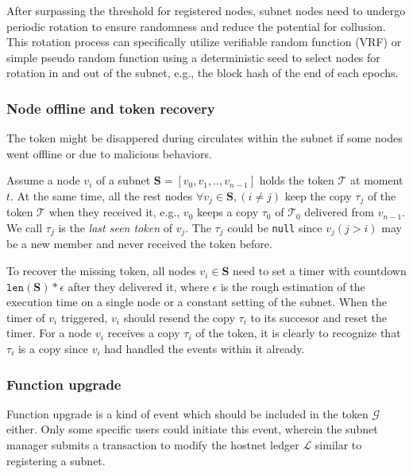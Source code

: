 \documentclass[11pt]{article}
\begin{document}
After surpassing the threshold for registered nodes, subnet nodes need to undergo periodic rotation to ensure randomness and reduce the potential for collusion.
This rotation process can specifically utilize verifiable random function (VRF) or simple pseudo random function using a deterministic seed to select nodes for rotation in and out of the subnet, e.g., the block hash of the end of each epochs.


\subsubsection{Node offline and token recovery}
The token might be disappered during circulates within the subnet if some nodes went offline or due to malicious behaviors.

Assume a node $v_{i}$ of a subnet $\mathbf{S} = [v_{0}, v_{1}, .., v_{n-1}]$ holds the token $\mathcal{T}$ at moment $t$.
At the same time, all the rest nodes $\forall v_{j} \in \mathbf{S}, (i \ne j)$ keep the copy $\tau_{j}$ of the token $\mathcal{T}$ when they received it, e.g., $v_{0}$ keeps a copy $\tau_{0}$ of $\mathcal{T}_{0}$ delivered from $v_{n-1}$.
We call $\tau_{j}$ is the \textit{last seen token} of $v_{j}$.
The $\tau_{j}$ could be \texttt{null} since $v_{j}(j > i)$ may be a new member and never received the token before.

To recover the missing token, all nodes $v_{i} \in \mathbf{S}$ need to set a timer with countdown $\texttt{len}(\mathbf{S}) * \epsilon$ after they delivered it, where $\epsilon$ is the rough estimation of the execution time on a single node or a constant setting of the subnet.
When the timer of $v_{i}$ triggered, $v_{i}$ should resend the copy $\tau_{i}$ to its succesor and reset the timer.
For a node $v_{i}$ receives a copy $\tau_{i}$ of the token, it is clearly to recognize that $\tau_{i}$ is a copy since $v_{i}$ had handled the events within it already.

\subsubsection{Function upgrade}
Function upgrade is a kind of event which should be included in the token $\mathcal{G}$ either.
Only some specific users could initiate this event, wherein the subnet manager submits a transaction to modify the hostnet ledger $\mathcal{L}$ similar to registering a subnet.
\end{document}
